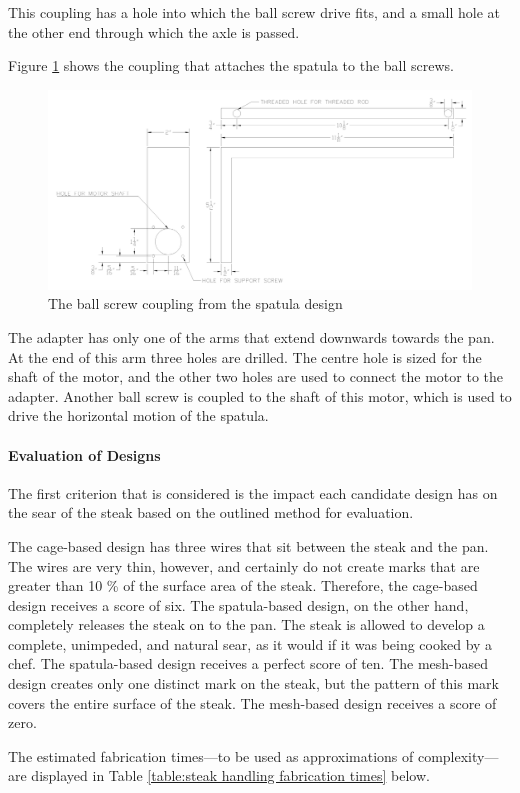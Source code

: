\documentclass[11pt]{article}
\newcommand{\subsubsubsection}[1]{\paragraph{#1}\mbox{}}
\begin{document}
This coupling has a hole into which the ball screw drive fits, and a small hole at the other end through which the axle is passed.

Figure \ref{fig:spatula support} shows the coupling that attaches the spatula to the ball screws.

\begin{figure}[H]
  \centering
  \includegraphics[width=0.6\linewidth]{res/spatula_support.png}
  \caption{The ball screw coupling from the spatula design}
  \label{fig:spatula support}
\end{figure}

The adapter has only one of the arms that extend downwards towards the pan.
At the end of this arm three holes are drilled.
The centre hole is sized for the shaft of the motor, and the other two holes are used to connect the motor to the adapter.
Another ball screw is coupled to the shaft of this motor, which is used to drive the horizontal motion of the spatula.

\subsubsubsection{Evaluation of Designs}

\noindent
The first criterion that is considered is the impact each candidate design has on the sear of the steak based on the outlined method for evaluation.

The cage-based design has three wires that sit between the steak and the pan.
The wires are very thin, however, and certainly do not create marks that are greater than 10 \% of the surface area of the steak.
Therefore, the cage-based design receives a score of six.
The spatula-based design, on the other hand, completely releases the steak on to the pan.
The steak is allowed to develop a complete, unimpeded, and natural sear, as it would if it was being cooked by a chef.
The spatula-based design receives a perfect score of ten.
The mesh-based design creates only one distinct mark on the steak, but the pattern of this mark covers the entire surface of the steak.
The mesh-based design receives a score of zero.

The estimated fabrication times---to be used as approximations of complexity---are displayed in Table \ref{table:steak handling fabrication times} below.
\end{document}
